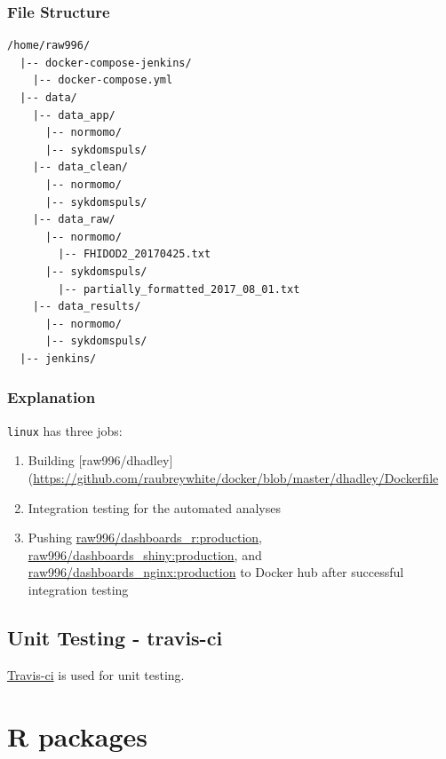 \documentclass[12pt,]{article}
\providecommand{\tightlist}{%
  \setlength{\itemsep}{0pt}\setlength{\parskip}{0pt}}
\begin{document}
\subsubsection{File Structure}\label{file-structure-2}

\begin{verbatim}
/home/raw996/
  |-- docker-compose-jenkins/
    |-- docker-compose.yml
  |-- data/
    |-- data_app/
      |-- normomo/
      |-- sykdomspuls/
    |-- data_clean/
      |-- normomo/
      |-- sykdomspuls/
    |-- data_raw/
      |-- normomo/
        |-- FHIDOD2_20170425.txt
      |-- sykdomspuls/
        |-- partially_formatted_2017_08_01.txt
    |-- data_results/
      |-- normomo/
      |-- sykdomspuls/
  |-- jenkins/
\end{verbatim}

\subsubsection{Explanation}\label{explanation-1}

\texttt{linux} has three jobs:

\begin{enumerate}
\def\labelenumi{\arabic{enumi}.}
\tightlist
\item
  Building
  {[}raw996/dhadley{]}(\url{https://github.com/raubreywhite/docker/blob/master/dhadley/Dockerfile}
\item
  Integration testing for the automated analyses
\item
  Pushing
  \href{https://hub.docker.com/r/raw996/dashboards_r/}{raw996/dashboards\_r:production},
  \href{https://hub.docker.com/r/raw996/dashboards_shiny/}{raw996/dashboards\_shiny:production},
  and
  \href{https://hub.docker.com/r/raw996/dashboards_nginx/}{raw996/dashboards\_nginx:production}
  to Docker hub after successful integration testing
\end{enumerate}

\subsection{Unit Testing - travis-ci}\label{unit-testing---travis-ci}

\href{http://travis-ci.org/folkehelseinstituttet}{Travis-ci} is used for
unit testing.

\section{R packages}\label{r-packages}
\end{document}
